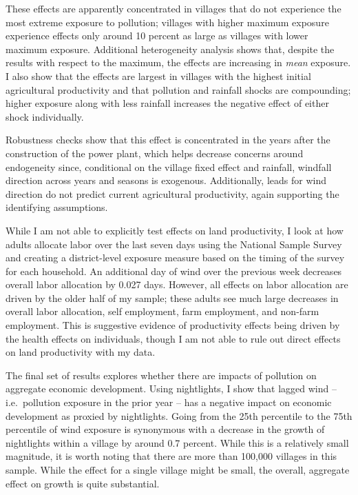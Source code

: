\documentclass[
]{article}
\begin{document}
These effects are apparently concentrated in villages that do not experience the most extreme exposure to pollution; villages with higher maximum exposure experience effects only around 10 percent as large as villages with lower maximum exposure. Additional heterogeneity analysis shows that, despite the results with respect to the maximum, the effects are increasing in \emph{mean} exposure. I also show that the effects are largest in villages with the highest initial agricultural productivity and that pollution and rainfall shocks are compounding; higher exposure along with less rainfall increases the negative effect of either shock individually.

Robustness checks show that this effect is concentrated in the years after the construction of the power plant, which helps decrease concerns around endogeneity since, conditional on the village fixed effect and rainfall, windfall direction across years and seasons is exogenous. Additionally, leads for wind direction do not predict current agricultural productivity, again supporting the identifying assumptions.

While I am not able to explicitly test effects on land productivity, I look at how adults allocate labor over the last seven days using the National Sample Survey and creating a district-level exposure measure based on the timing of the survey for each household. An additional day of wind over the previous week decreases overall labor allocation by 0.027 days. However, all effects on labor allocation are driven by the older half of my sample; these adults see much large decreases in overall labor allocation, self employment, farm employment, and non-farm employment. This is suggestive evidence of productivity effects being driven by the health effects on individuals, though I am not able to rule out direct effects on land productivity with my data.

The final set of results explores whether there are impacts of pollution on aggregate economic development. Using nightlights, I show that lagged wind -- i.e.~pollution exposure in the prior year -- has a negative impact on economic development as proxied by nightlights. Going from the 25th percentile to the 75th percentile of wind exposure is synonymous with a decrease in the growth of nightlights within a village by around 0.7 percent. While this is a relatively small magnitude, it is worth noting that there are more than 100,000 villages in this sample. While the effect for a single village might be small, the overall, aggregate effect on growth is quite substantial.
\end{document}
